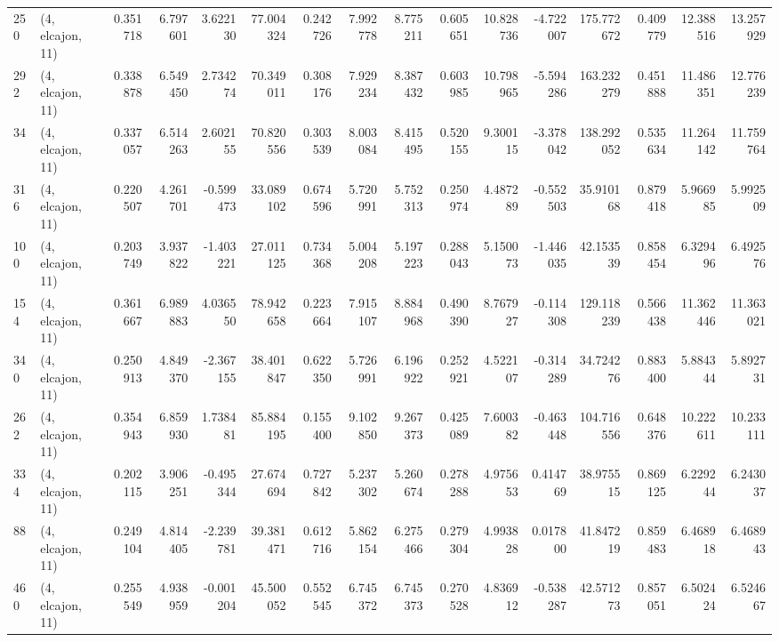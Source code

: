 \begin{tabular}{llrrrrrrrrrrrrrr}
250 &  (4, elcajon, 11) &   0.351718 &   6.797601 &   3.622130 &    77.004324 &   0.242726 &   7.992778 &   8.775211 &  0.605651 &  10.828736 &  -4.722007 &    175.772672 &   0.409779 &  12.388516 &   13.257929 \\
292 &  (4, elcajon, 11) &   0.338878 &   6.549450 &   2.734274 &    70.349011 &   0.308176 &   7.929234 &   8.387432 &  0.603985 &  10.798965 &  -5.594286 &    163.232279 &   0.451888 &  11.486351 &   12.776239 \\
34  &  (4, elcajon, 11) &   0.337057 &   6.514263 &   2.602155 &    70.820556 &   0.303539 &   8.003084 &   8.415495 &  0.520155 &   9.300115 &  -3.378042 &    138.292052 &   0.535634 &  11.264142 &   11.759764 \\
316 &  (4, elcajon, 11) &   0.220507 &   4.261701 &  -0.599473 &    33.089102 &   0.674596 &   5.720991 &   5.752313 &  0.250974 &   4.487289 &  -0.552503 &     35.910168 &   0.879418 &   5.966985 &    5.992509 \\
100 &  (4, elcajon, 11) &   0.203749 &   3.937822 &  -1.403221 &    27.011125 &   0.734368 &   5.004208 &   5.197223 &  0.288043 &   5.150073 &  -1.446035 &     42.153539 &   0.858454 &   6.329496 &    6.492576 \\
154 &  (4, elcajon, 11) &   0.361667 &   6.989883 &   4.036550 &    78.942658 &   0.223664 &   7.915107 &   8.884968 &  0.490390 &   8.767927 &  -0.114308 &    129.118239 &   0.566438 &  11.362446 &   11.363021 \\
340 &  (4, elcajon, 11) &   0.250913 &   4.849370 &  -2.367155 &    38.401847 &   0.622350 &   5.726991 &   6.196922 &  0.252921 &   4.522107 &  -0.314289 &     34.724276 &   0.883400 &   5.884344 &    5.892731 \\
262 &  (4, elcajon, 11) &   0.354943 &   6.859930 &   1.738481 &    85.884195 &   0.155400 &   9.102850 &   9.267373 &  0.425089 &   7.600382 &  -0.463448 &    104.716556 &   0.648376 &  10.222611 &   10.233111 \\
334 &  (4, elcajon, 11) &   0.202115 &   3.906251 &  -0.495344 &    27.674694 &   0.727842 &   5.237302 &   5.260674 &  0.278288 &   4.975653 &   0.414769 &     38.975515 &   0.869125 &   6.229244 &    6.243037 \\
88  &  (4, elcajon, 11) &   0.249104 &   4.814405 &  -2.239781 &    39.381471 &   0.612716 &   5.862154 &   6.275466 &  0.279304 &   4.993828 &   0.017800 &     41.847219 &   0.859483 &   6.468918 &    6.468943 \\
460 &  (4, elcajon, 11) &   0.255549 &   4.938959 &  -0.001204 &    45.500052 &   0.552545 &   6.745372 &   6.745373 &  0.270528 &   4.836912 &  -0.538287 &     42.571273 &   0.857051 &   6.502424 &    6.524667 \\

\end{tabular}
